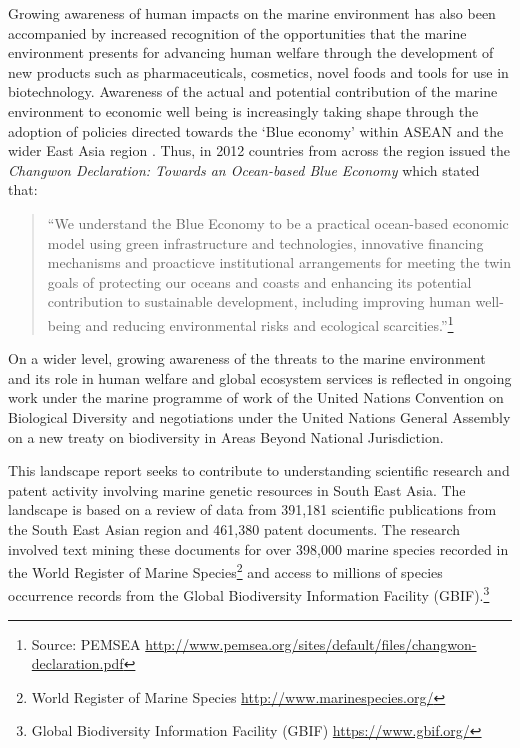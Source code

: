 \documentclass[]{book}
\let\rmarkdownfootnote\footnote%
\def\footnote{\protect\rmarkdownfootnote}
\theoremstyle{definition}
\theoremstyle{definition}
\theoremstyle{definition}
\theoremstyle{remark}
\begin{document}
Growing awareness of human impacts on the marine environment has also
been accompanied by increased recognition of the opportunities that the
marine environment presents for advancing human welfare through the
development of new products such as pharmaceuticals, cosmetics, novel
foods and tools for use in biotechnology. Awareness of the actual and
potential contribution of the marine environment to economic well being
is increasingly taking shape through the adoption of policies directed
towards the `Blue economy' within ASEAN and the wider East Asia region
\citep{Gamage_2016}. Thus, in 2012 countries from across the region
issued the \emph{Changwon Declaration: Towards an Ocean-based Blue
Economy} which stated that:

\begin{quote}
``We understand the Blue Economy to be a practical ocean-based economic
model using green infrastructure and technologies, innovative financing
mechanisms and proacticve institutional arrangements for meeting the
twin goals of protecting our oceans and coasts and enhancing its
potential contribution to sustainable development, including improving
human well-being and reducing environmental risks and ecological
scarcities.''\footnote{Source: PEMSEA
  \url{http://www.pemsea.org/sites/default/files/changwon-declaration.pdf}}
\end{quote}

On a wider level, growing awareness of the threats to the marine
environment and its role in human welfare and global ecosystem services
is reflected in ongoing work under the marine programme of work of the
United Nations Convention on Biological Diversity and negotiations under
the United Nations General Assembly on a new treaty on biodiversity in
Areas Beyond National Jurisdiction.

This landscape report seeks to contribute to understanding scientific
research and patent activity involving marine genetic resources in South
East Asia. The landscape is based on a review of data from 391,181
scientific publications from the South East Asian region and 461,380
patent documents. The research involved text mining these documents for
over 398,000 marine species recorded in the World Register of Marine
Species\footnote{World Register of Marine Species
  \url{http://www.marinespecies.org/}} and access to millions of species
occurrence records from the Global Biodiversity Information Facility
(GBIF).\footnote{Global Biodiversity Information Facility (GBIF)
  \url{https://www.gbif.org/}}
\end{document}
